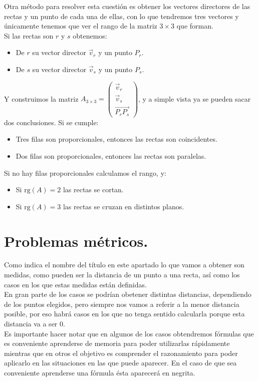 \documentclass[a4paper,11pt,answers]{exam}
\newcommand\rango[1]{\mathrm{rg}(#1)}
\begin{document}
Otra método para resolver esta cuestión es obtener los vectores directores de las rectas y un punto de cada una de ellas, con lo que tendremos tres vectores y únicamente tenemos que ver el rango de la matriz $3 \times 3$ que forman.\\
Si las rectas son $r $ y $s$ obtenemos:
\begin{itemize}
	\item De $r$ su vector director $\vec{v}_r$ y un punto $P_r$.
	\item De $s$ su vector director $\vec{v}_s$ y un punto $P_s$.
\end{itemize}
Y construimos la matriz $A_{3 \times 3}=\begin{pmatrix}
\vec{v}_r\\\vec{v}_s\\\overrightarrow{P_r P_s}
\end{pmatrix}$, y a simple vista ya se pueden sacar dos conclusiones. Si se cumple:
\begin{itemize}
	\item Tres filas son proporcionales, entonces las rectas son coincidentes.
	\item Dos filas son proporcionales, entonces las rectas son paralelas.
\end{itemize}
Si no hay filas proporcionales calculamos el rango, y:
\begin{itemize}
	\item Si $\rango{A} = 2$ las rectas se cortan.
	\item Si $\rango{A} = 3$ las rectas se cruzan en distintos planos.
\end{itemize}
\section{Problemas métricos.}
Como indica el nombre del título en este apartado lo que vamos a obtener son medidas, como pueden ser la distancia de un punto a una recta, así como los casos en los que estas medidas están definidas.\\
En gran parte de los casos se podrían obetener distintas distancias, dependiendo de los puntos elegidos, pero siempre nos vamos a referir a la menor distancia posible, por eso habrá casos en los que no tenga sentido calcularla porque esta distancia va a ser 0.\\

Es importante hacer notar que en algunos de los casos obtendremos fórmulas que es conveniente aprenderse de memoria para poder utilizarlas rápidamente mientras que en otros el objetivo es comprender el razonamiento para poder aplicarlo en las situaciones en las que puede aparecer. En el caso de que sea conveniente aprenderse una fórmula ésta aparecerá en negrita.\\
\end{document}
